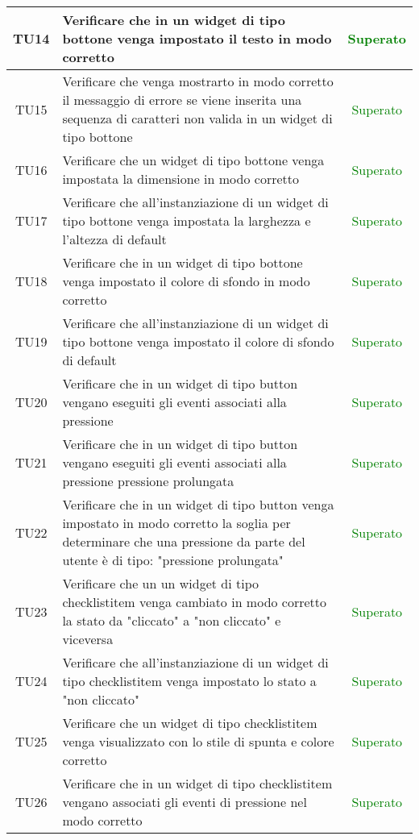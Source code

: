 \begin{center}
\begin{longtable}{|c|>{\centering}m{10cm}|c|}
		TU14 & Verificare che in un widget di tipo bottone venga impostato il testo in modo corretto & \textcolor{Green}{Superato}\\ \hline
		TU15 & Verificare che venga mostrarto in modo corretto il messaggio di errore se viene inserita una sequenza di caratteri non valida in un widget di tipo bottone & \textcolor{Green}{Superato}\\ \hline
		TU16 & Verificare che un widget di tipo bottone venga impostata la dimensione in modo corretto & \textcolor{Green}{Superato}\\ \hline
		TU17 & Verificare che all'instanziazione di un widget di tipo bottone venga impostata la larghezza e l'altezza di default & \textcolor{Green}{Superato}\\ \hline
		TU18 & Verificare che in un widget di tipo bottone venga impostato il colore di sfondo in modo corretto & \textcolor{Green}{Superato}\\ \hline
		TU19 & Verificare che all'instanziazione di un widget di tipo bottone venga impostato il colore di sfondo di default & \textcolor{Green}{Superato}\\ \hline
		TU20 & Verificare che in un widget di tipo button vengano eseguiti gli eventi associati alla pressione & \textcolor{Green}{Superato}\\ \hline
		TU21 & Verificare che in un widget di tipo button vengano eseguiti gli eventi associati alla pressione pressione prolungata & \textcolor{Green}{Superato}\\ \hline
		TU22 & Verificare che in un widget di tipo button venga impostato in modo corretto la soglia per determinare che una pressione da parte del utente è di tipo: "pressione prolungata" & \textcolor{Green}{Superato}\\ \hline
		TU23 & Verificare che un un widget di tipo checklistitem venga cambiato in modo corretto la stato da "cliccato" a "non cliccato" e viceversa & \textcolor{Green}{Superato}\\ \hline
		TU24 & Verificare che all'instanziazione di un widget di tipo checklistitem venga impostato lo stato a "non cliccato" & \textcolor{Green}{Superato}\\ \hline
		TU25 & Verificare che un widget di tipo checklistitem venga visualizzato con lo stile di spunta e colore corretto & \textcolor{Green}{Superato}\\ \hline
		TU26 & Verificare che in un widget di tipo checklistitem vengano associati gli eventi di pressione nel modo corretto & \textcolor{Green}{Superato}\\ \hline

\end{longtable}
\end{center}
